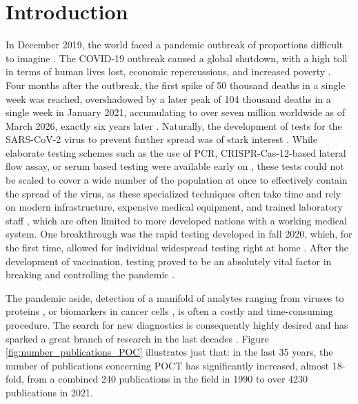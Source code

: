 \chapter{Introduction}
In December 2019, the world faced a pandemic outbreak of proportions difficult to imagine \cite{Ciotti2020,Vandenberg2020}.
The COVID-19 outbreak caused a global shutdown, with a high toll in terms of human lives lost, economic repercussions, and increased poverty \cite{Ciotti2020}. 
Four months after the outbreak, the first spike of 50 thousand deaths in a single week was reached, overshadowed by a later peak of 104 thousand deaths in a single week in January 2021, accumulating to over seven million worldwide as of March 2026, exactly six years later \cite{WHO_covid_deaths}.
Naturally, the development of tests for the SARS-CoV-2 virus to prevent further spread was of stark interest \cite{Vandenberg2020}.  
While elaborate testing schemes such as the use of \ac{PCR}, \ac{CRISPR-Cas}-12-based lateral flow assay, or serum based testing were available early on \cite{Ciotti2020,Vandenberg2020}, these tests could not be scaled to cover a wide number of the population at once to effectively contain the spread of the virus, as these specialized techniques often take time and rely on modern infrastructure, expensive medical equipment, and trained laboratory staff \cite{Vandenberg2020}, which are often limited to more developed nations with a working medical system. 
One breakthrough was the rapid testing developed in fall 2020, which, for the first time, allowed for individual widespread testing right at home \cite{Vandenberg2020}. 
After the development of vaccination, testing proved to be an absolutely vital factor in breaking and controlling the pandemic \cite{Peeling2022,Vandenberg2020}.

The pandemic aside, detection of a manifold of analytes ranging from viruses \cite{SanchezGalan2021,Verheyen2015,Nique2021,Vandenberg2020} to proteins \cite{Szabo2015,Gajdosova2021}, or biomarkers in cancer cells \cite{Topkaya2016,Li2012,Wu2015}, is often a costly and time-consuming procedure.
The search for new diagnostics is consequently highly desired \cite{Haleem2021,Oyewole2021,Vandenberg2020} and has sparked a great branch of research in the last decades \cite{Reginka2021,Knight2002,Kricka2001,Holland2005, Ehresmann2015,Wang2014}.
Figure \ref{fig:number_publications_POC} illustrates just that: in the last 35 years, the number of publications concerning \ac{POCT} has significantly increased, almost 18-fold, from a combined 240 publications in the field in 1990 to over 4230 publications in 2021.


